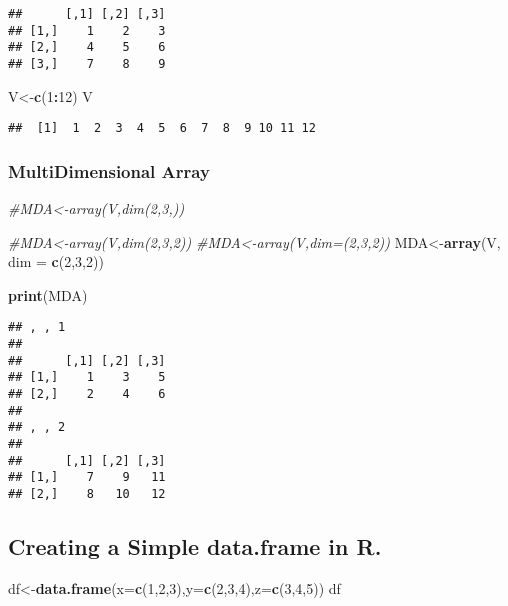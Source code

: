 \documentclass[
]{article}
\newenvironment{Shaded}{\begin{snugshade}}{\end{snugshade}}
\newcommand{\AttributeTok}[1]{\textcolor[rgb]{0.13,0.29,0.53}{#1}}
\newcommand{\CommentTok}[1]{\textcolor[rgb]{0.56,0.35,0.01}{\textit{#1}}}
\newcommand{\DecValTok}[1]{\textcolor[rgb]{0.00,0.00,0.81}{#1}}
\newcommand{\FunctionTok}[1]{\textcolor[rgb]{0.13,0.29,0.53}{\textbf{#1}}}
\newcommand{\NormalTok}[1]{#1}
\newcommand{\OtherTok}[1]{\textcolor[rgb]{0.56,0.35,0.01}{#1}}
\newcommand{\SpecialCharTok}[1]{\textcolor[rgb]{0.81,0.36,0.00}{\textbf{#1}}}
\begin{document}
\begin{verbatim}
##      [,1] [,2] [,3]
## [1,]    1    2    3
## [2,]    4    5    6
## [3,]    7    8    9
\end{verbatim}

\begin{Shaded}
\begin{Highlighting}[]
\NormalTok{V}\OtherTok{\textless{}{-}}\FunctionTok{c}\NormalTok{(}\DecValTok{1}\SpecialCharTok{:}\DecValTok{12}\NormalTok{)}
\NormalTok{V}
\end{Highlighting}
\end{Shaded}

\begin{verbatim}
##  [1]  1  2  3  4  5  6  7  8  9 10 11 12
\end{verbatim}

\subsubsection{MultiDimensional Array}\label{multidimensional-array}

\begin{Shaded}
\begin{Highlighting}[]
\CommentTok{\#MDA\textless{}{-}array(V,dim(2,3,))}

\CommentTok{\#MDA\textless{}{-}array(V,dim(2,3,2))}
\CommentTok{\#MDA\textless{}{-}array(V,dim=(2,3,2))}
\NormalTok{MDA}\OtherTok{\textless{}{-}}\FunctionTok{array}\NormalTok{(V, }\AttributeTok{dim =} \FunctionTok{c}\NormalTok{(}\DecValTok{2}\NormalTok{,}\DecValTok{3}\NormalTok{,}\DecValTok{2}\NormalTok{))}

\FunctionTok{print}\NormalTok{(MDA)}
\end{Highlighting}
\end{Shaded}

\begin{verbatim}
## , , 1
## 
##      [,1] [,2] [,3]
## [1,]    1    3    5
## [2,]    2    4    6
## 
## , , 2
## 
##      [,1] [,2] [,3]
## [1,]    7    9   11
## [2,]    8   10   12
\end{verbatim}

\subsection{Creating a Simple data.frame in
R.}\label{creating-a-simple-data.frame-in-r.}

\begin{Shaded}
\begin{Highlighting}[]
\NormalTok{df}\OtherTok{\textless{}{-}}\FunctionTok{data.frame}\NormalTok{(}\AttributeTok{x=}\FunctionTok{c}\NormalTok{(}\DecValTok{1}\NormalTok{,}\DecValTok{2}\NormalTok{,}\DecValTok{3}\NormalTok{),}\AttributeTok{y=}\FunctionTok{c}\NormalTok{(}\DecValTok{2}\NormalTok{,}\DecValTok{3}\NormalTok{,}\DecValTok{4}\NormalTok{),}\AttributeTok{z=}\FunctionTok{c}\NormalTok{(}\DecValTok{3}\NormalTok{,}\DecValTok{4}\NormalTok{,}\DecValTok{5}\NormalTok{))}
\NormalTok{df}
\end{Highlighting}
\end{Shaded}
\end{document}
